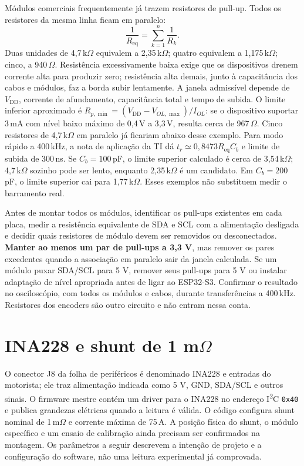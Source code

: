 Módulos comerciais frequentemente já trazem resistores de pull-up. Todos os resistores da mesma linha ficam em paralelo:
\begin{equation}
\frac{1}{R_{\mathrm{eq}}}=\sum_{k=1}^{n}\frac{1}{R_k}.
\label{eq:pullup}
\end{equation}
Duas unidades de 4,7\,k$\Omega$ equivalem a 2,35\,k$\Omega$; quatro equivalem a 1,175\,k$\Omega$; cinco, a 940\,$\Omega$. Resistência excessivamente baixa exige que os dispositivos drenem corrente alta para produzir zero; resistência alta demais, junto à capacitância dos cabos e módulos, faz a borda subir lentamente. A janela admissível depende de $V_{\mathrm{DD}}$, corrente de afundamento, capacitância total e tempo de subida. O limite inferior aproximado é $R_{p,\min}=(V_{\mathrm{DD}}-V_{OL,\max})/I_{OL}$: se o dispositivo suportar 3\,mA com nível baixo máximo de 0,4\,V a 3,3\,V, resulta cerca de 967\,$\Omega$. Cinco resistores de 4,7\,k$\Omega$ em paralelo já ficariam abaixo desse exemplo. Para modo rápido a 400\,kHz, a nota de aplicação da TI dá $t_r \simeq 0{,}8473R_{\mathrm{eq}}C_b$ e limite de subida de 300\,ns. Se $C_b=100$\,pF, o limite superior calculado é cerca de 3,54\,k$\Omega$; 4,7\,k$\Omega$ sozinho pode ser lento, enquanto 2,35\,k$\Omega$ é um candidato. Em $C_b=200$\,pF, o limite superior cai para 1,77\,k$\Omega$. Esses exemplos não substituem medir o barramento real.

Antes de montar todos os módulos, identificar os pull-ups existentes em cada placa, medir a resistência equivalente de SDA e SCL com a alimentação desligada e decidir quais resistores de módulo devem ser removidos ou desconectados. \textbf{Manter ao menos um par de pull-ups a 3,3 V}, mas remover os pares excedentes quando a associação em paralelo sair da janela calculada. Se um módulo puxar SDA/SCL para 5 V, remover seus pull-ups para 5 V ou instalar adaptação de nível apropriada antes de ligar ao ESP32-S3. Confirmar o resultado no osciloscópio, com todos os módulos e cabos, durante transferências a 400\,kHz. Resistores dos encoders são outro circuito e não entram nessa conta.

\section{INA228 e shunt de 1 m$\Omega$}
O conector J8 da folha de periféricos é denominado INA228 e entradas do motorista; ele traz alimentação indicada como 5 V, GND, SDA/SCL e outros sinais. O firmware mestre contém um driver para o INA228 no endereço I\textsuperscript{2}C \texttt{0x40} e publica grandezas elétricas quando a leitura é válida. O código configura shunt nominal de 1\,m$\Omega$ e corrente máxima de 75\,A. A posição física do shunt, o módulo específico e um ensaio de calibração ainda precisam ser confirmados na montagem. Os parâmetros a seguir descrevem a intenção de projeto e a configuração do software, não uma leitura experimental já comprovada.

